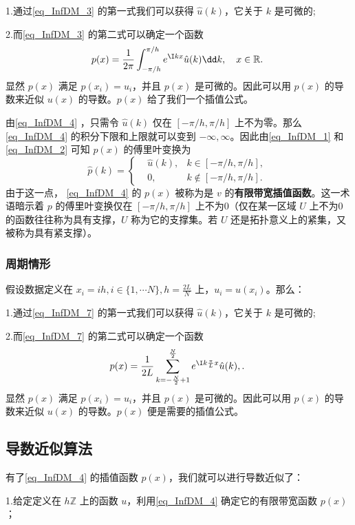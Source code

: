 1.通过\autoref{eq_InfDM_3} 的第一式我们可以获得 $\hat u(k)$，它关于 $k$ 是可微的;

2.而\autoref{eq_InfDM_3} 的第二式可以确定一个函数 
\begin{equation}\label{eq_InfDM_4}
p(x)=\frac{1}{2\pi}\int_{-\pi/h}^{\pi/h} e^{\I kx}\hat u(k)\dd k,\quad x\in \mathbb R.~
\end{equation}
显然 $p(x)$ 满足 $p(x_i)=u_i$，并且 $p(x)$ 是可微的。因此可以用 $p(x)$ 的导数来近似 $u(x)$ 的导数。$p(x)$ 给了我们一个插值公式。

由\autoref{eq_InfDM_4} ，只需令 $\hat u(k)$ 仅在 $[-\pi/h,\pi/h]$ 上不为零。那么\autoref{eq_InfDM_4} 的积分下限和上限就可以变到 $-\infty,\infty$。因此由\autoref{eq_InfDM_1} 和\autoref{eq_InfDM_2} 可知 $p(x)$ 的傅里叶变换为
\begin{equation}
\hat p(k)=\left\{\begin{aligned}
&\hat u(k),&k\in[-\pi/h,\pi/h],\\
&0,&k\not\in[-\pi/h,\pi/h].
\end{aligned}\right.~
\end{equation}
由于这一点， \autoref{eq_InfDM_4} 的  $p(x)$ 被称为是 $v$ 的\textbf{有限带宽插值函数}。这一术语暗示着 $p$ 的傅里叶变换仅在 $[-\pi/h,\pi/h]$ 上不为0（仅在某一区域 $U$ 上不为0的函数往往称为具有支撑，$U$ 称为它的支撑集。若 $U$ 还是拓扑意义上的紧集，又被称为具有紧支撑）。

\subsubsection{周期情形}
假设数据定义在 $x_i=ih,i\in\{1,\cdots N\},h=\frac{2L}{N}$ 上，$u_i=u(x_i)$。那么：

1.通过\autoref{eq_InfDM_7} 的第一式我们可以获得 $\hat u(k)$，它关于 $k$ 是可微的;

2.而\autoref{eq_InfDM_7} 的第二式可以确定一个函数 
\begin{equation}
p(x)=\frac{1}{2L}\sum_{k=-\frac{N}{2}+1}^{\frac{N}{2}}e^{\I k\frac{\pi}{L}x}\hat u(k),.~
\end{equation}
显然 $p(x)$ 满足 $p(x_i)=u_i$，并且 $p(x)$ 是可微的。因此可以用 $p(x)$ 的导数来近似 $u(x)$ 的导数。$p(x)$ 便是需要的插值公式。

\subsection{导数近似算法}
有了\autoref{eq_InfDM_4} 的插值函数 $p(x)$，我们就可以进行导数近似了：

1.给定定义在 $h\mathbb Z$ 上的函数 $u$，利用\autoref{eq_InfDM_4} 确定它的有限带宽函数 $p(x)$；


